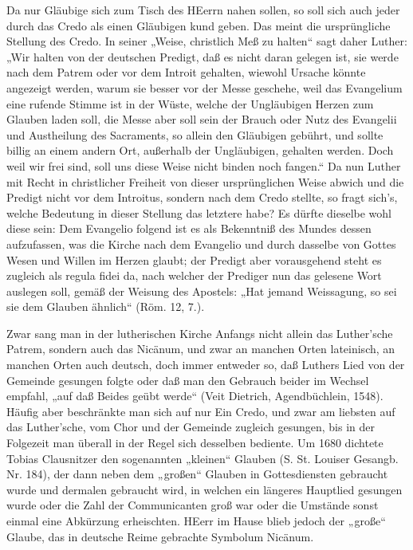 Da nur Gläubige sich zum Tisch des HEerrn nahen sollen, so soll sich auch jeder durch das Credo als einen Gläubigen kund geben. Das meint die ursprüngliche Stellung des Credo. In seiner „Weise, christlich Meß zu halten“ sagt daher Luther: „Wir halten von der deutschen Predigt, daß es nicht daran gelegen ist, sie werde nach dem Patrem oder vor dem Introit gehalten, wiewohl Ursache könnte angezeigt werden, warum sie besser vor der Messe geschehe, weil das Evangelium eine rufende Stimme ist in der Wüste, welche der Ungläubigen Herzen zum Glauben laden soll, die Messe aber soll sein der Brauch oder Nutz des Evangelii und Austheilung des Sacraments, so allein den Gläubigen gebührt, und sollte billig an einem andern Ort, außerhalb der Ungläubigen, gehalten werden. Doch weil wir frei sind, soll uns diese Weise nicht binden noch fangen.“ Da nun Luther mit Recht in christlicher Freiheit von dieser ursprünglichen Weise abwich und die Predigt nicht vor dem Introitus, sondern nach dem Credo stellte, so fragt sich’s, welche Bedeutung in dieser Stellung das letztere habe? Es dürfte dieselbe wohl diese sein: Dem Evangelio folgend ist es als Bekenntniß des Mundes dessen aufzufassen, was die Kirche nach dem Evangelio und durch dasselbe von Gottes Wesen und Willen im Herzen glaubt; der Predigt aber vorausgehend steht es zugleich als regula fidei da, nach welcher der Prediger nun das gelesene Wort auslegen soll, gemäß der Weisung des Apostels: „Hat jemand Weissagung, so sei sie dem Glauben ähnlich“ (Röm. 12, 7.).

Zwar sang man in der lutherischen Kirche Anfangs nicht allein das Luther’sche Patrem, sondern auch das Nicänum, und zwar an manchen Orten lateinisch, an manchen Orten auch deutsch, doch immer entweder so, daß Luthers Lied von der Gemeinde gesungen folgte oder daß man den Gebrauch beider im Wechsel empfahl, „auf daß Beides geübt werde“ (Veit Dietrich, Agendbüchlein, 1548). Häufig aber beschränkte man sich auf nur Ein Credo, und zwar am liebsten auf das Luther’sche, vom Chor und der Gemeinde zugleich gesungen, bis in der Folgezeit man überall in der Regel sich desselben bediente. Um 1680 dichtete Tobias Clausnitzer den sogenannten „kleinen“ Glauben (S. St. Louiser Gesangb. Nr. 184), der dann neben dem „großen“ Glauben in Gottesdiensten gebraucht wurde und dermalen gebraucht wird, in welchen ein längeres Hauptlied gesungen wurde oder die Zahl der Communicanten groß war oder die Umstände sonst einmal eine Abkürzung erheischten. HEerr im Hause blieb jedoch der „große“ Glaube, das in deutsche Reime gebrachte Symbolum Nicänum.

